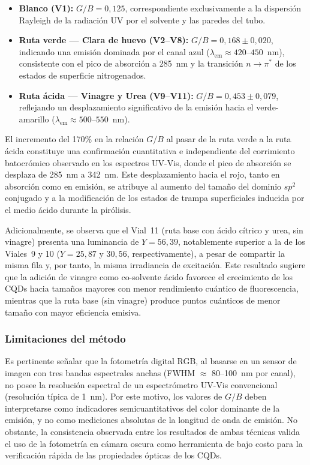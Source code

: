 \begin{itemize}
    \item \textbf{Blanco (V1):} $G/B = 0{,}125$, correspondiente
    exclusivamente a la dispersión Rayleigh de la radiación UV por el
    solvente y las paredes del tubo.

    \item \textbf{Ruta verde --- Clara de huevo (V2--V8):}
    $G/B = 0{,}168 \pm 0{,}020$, indicando una emisión dominada por el
    canal azul ($\lambda_{\text{em}} \approx 420$--$450$~nm), consistente
    con el pico de absorción a 285~nm y la transición $n \to \pi^*$ de
    los estados de superficie nitrogenados.

    \item \textbf{Ruta ácida --- Vinagre y Urea (V9--V11):}
    $G/B = 0{,}453 \pm 0{,}079$, reflejando un desplazamiento
    significativo de la emisión hacia el verde-amarillo
    ($\lambda_{\text{em}} \approx 500$--$550$~nm).
\end{itemize}

El incremento del 170\% en la relación $G/B$ al pasar de la ruta verde
a la ruta ácida constituye una confirmación cuantitativa e independiente
del corrimiento batocrómico observado en los espectros UV-Vis, donde el
pico de absorción se desplaza de 285~nm a 342~nm. Este desplazamiento
hacia el rojo, tanto en absorción como en emisión, se atribuye al aumento
del tamaño del dominio $sp^2$ conjugado y a la modificación de los estados
de trampa superficiales inducida por el medio ácido durante la pirólisis.

Adicionalmente, se observa que el Vial~11 (ruta base con ácido cítrico y
urea, sin vinagre) presenta una luminancia de $Y = 56{,}39$, notablemente
superior a la de los Viales~9 y 10 ($Y = 25{,}87$ y $30{,}56$,
respectivamente), a pesar de compartir la misma fila y, por tanto, la
misma irradiancia de excitación. Este resultado sugiere que la adición de
vinagre como co-solvente ácido favorece el crecimiento de los CQDs hacia
tamaños mayores con menor rendimiento cuántico de fluorescencia, mientras
que la ruta base (sin vinagre) produce puntos cuánticos de menor tamaño
con mayor eficiencia emisiva.

\subsubsection{Limitaciones del método}

Es pertinente señalar que la fotometría digital RGB, al basarse en un
sensor de imagen con tres bandas espectrales anchas (FWHM $\approx$
80--100~nm por canal), no posee la resolución espectral de un
espectrómetro UV-Vis convencional (resolución típica de 1~nm). Por este
motivo, los valores de $G/B$ deben interpretarse como indicadores
semicuantitativos del color dominante de la emisión, y no como mediciones
absolutas de la longitud de onda de emisión. No obstante, la consistencia
observada entre los resultados de ambas técnicas valida el uso de la
fotometría en cámara oscura como herramienta de bajo costo para la
verificación rápida de las propiedades ópticas de los CQDs.
